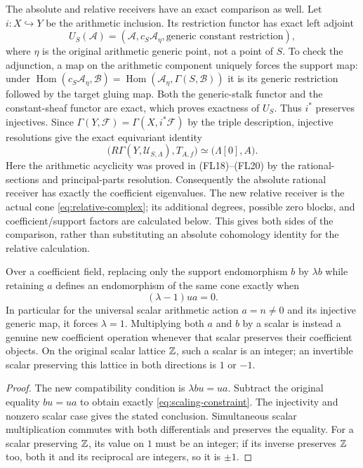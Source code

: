 The absolute and relative receivers have an exact comparison as
well. Let $i:X\hookrightarrow Y$ be the arithmetic inclusion. Its
restriction functor has exact left adjoint
\[
 U_S(\mathcal A)=
 (\mathcal A,c_S\mathcal A_\eta,\text{generic constant restriction}),
\]
where $\eta$ is the original arithmetic generic point, not a point
of $S$. To check the adjunction, a map on the arithmetic component
uniquely forces the support map: under
$\operatorname{Hom}(c_S\mathcal A_\eta,\mathcal B)
=\operatorname{Hom}(\mathcal A_\eta,\Gamma(S,\mathcal B))$
it is its generic restriction followed by the target gluing map.
Both the generic-stalk functor and the constant-sheaf functor are
exact, which proves exactness of $U_S$. Thus $i^*$ preserves
injectives. Since $\Gamma(Y,\mathcal F)=\Gamma(X,i^*\mathcal F)$
by the triple description, injective resolutions give the exact
equivariant identity
\[
 \bigl(R\Gamma(Y,\mathcal U_{S,\Lambda}),T_{A,f}\bigr)
 \simeq\bigl(\Lambda[0],A\bigr).
 \tag{SE7a}\label{eq:absolute-comparison}
\]
Here the arithmetic acyclicity was proved in (FL18)--(FL20) by the
rational-sections and principal-parts resolution. Consequently the
absolute rational receiver has exactly the coefficient eigenvalues.
The new relative receiver is the actual cone
\eqref{eq:relative-complex}; its additional degrees, possible zero
blocks, and coefficient/support factors are calculated below. This
gives both sides of the comparison, rather than substituting an
absolute cohomology identity for the relative calculation.

\begin{proposition}
\label{prop:rescaling}
Over a coefficient field, replacing only the support endomorphism
$b$ by $\lambda b$ while retaining $a$ defines an endomorphism of the
same cone exactly when
\[
 (\lambda-1)ua=0.
 \tag{SE8}\label{eq:scaling-constraint}
\]
In particular for the universal scalar arithmetic action $a=n\ne0$
and its injective generic map, it forces $\lambda=1$.
Multiplying both $a$ and $b$ by a scalar is instead a genuine new
coefficient operation whenever that scalar preserves their coefficient
objects. On the original scalar lattice $\mathbb Z$, such a scalar is an
integer; an invertible scalar preserving this lattice in both
directions is $1$ or $-1$.
\end{proposition}
\begin{proof}
The new compatibility condition is $\lambda bu=ua$.
Subtract the original equality $bu=ua$ to obtain exactly
\eqref{eq:scaling-constraint}. The injectivity and nonzero scalar
case gives the stated conclusion. Simultaneous scalar multiplication
commutes with both differentials and preserves the equality.
For a scalar preserving $\mathbb Z$, its value on $1$ must be an integer;
if its inverse preserves $\mathbb Z$ too, both it and its reciprocal are
integers, so it is $\pm1$.
\end{proof}

